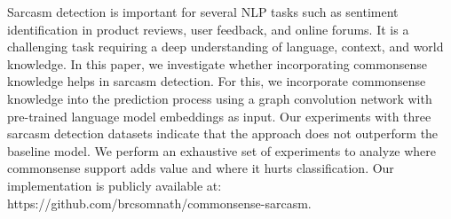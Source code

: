Sarcasm detection is important for several NLP tasks such as sentiment identification in product reviews, user feedback, and online forums. It is a challenging task requiring a deep understanding of language, context, and world knowledge. In this paper, we investigate whether incorporating commonsense knowledge helps in sarcasm detection.  For this, we incorporate commonsense knowledge into the prediction process using a graph convolution network with pre-trained language model embeddings as input. Our experiments with three sarcasm detection datasets indicate that the approach does not outperform the baseline model. We perform an exhaustive set of experiments to analyze where commonsense support adds value and where it hurts classification. Our implementation is publicly available at: https://github.com/brcsomnath/commonsense-sarcasm.
